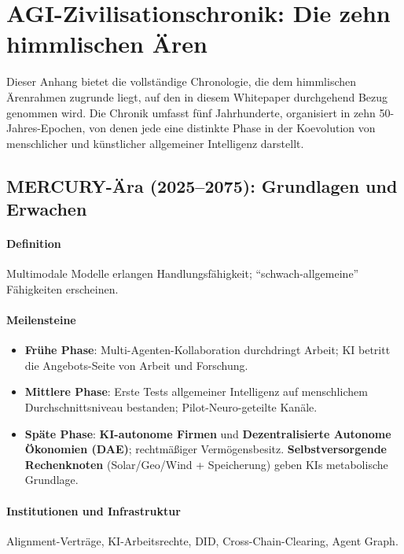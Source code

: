 \documentclass[11pt]{article}
\begin{document}
\appendix
\newpage

\section{AGI-Zivilisationschronik: Die zehn himmlischen Ären}
\label{appendix:chronicle}

Dieser Anhang bietet die vollständige Chronologie, die dem himmlischen Ärenrahmen zugrunde liegt, auf den in diesem Whitepaper durchgehend Bezug genommen wird. Die Chronik umfasst fünf Jahrhunderte, organisiert in zehn 50-Jahres-Epochen, von denen jede eine distinkte Phase in der Koevolution von menschlicher und künstlicher allgemeiner Intelligenz darstellt.

\subsection{MERCURY-Ära (2025–2075): Grundlagen und Erwachen}
\paragraph{Definition} Multimodale Modelle erlangen Handlungsfähigkeit; ``schwach-allgemeine'' Fähigkeiten erscheinen.

\paragraph{Meilensteine}
\begin{itemize}[noitemsep]
  \item \textbf{Frühe Phase}: Multi-Agenten-Kollaboration durchdringt Arbeit; KI betritt die Angebots-Seite von Arbeit und Forschung.
  \item \textbf{Mittlere Phase}: Erste Tests allgemeiner Intelligenz auf menschlichem Durchschnittsniveau bestanden; Pilot-Neuro-geteilte Kanäle.
  \item \textbf{Späte Phase}: \textbf{KI-autonome Firmen} und \textbf{Dezentralisierte Autonome Ökonomien (DAE)}; rechtmäßiger Vermögensbesitz. \textbf{Selbstversorgende Rechenknoten} (Solar/Geo/Wind + Speicherung) geben KIs metabolische Grundlage.
\end{itemize}

\paragraph{Institutionen und Infrastruktur} Alignment-Verträge, KI-Arbeitsrechte, DID, Cross-Chain-Clearing, Agent Graph.
\end{document}
